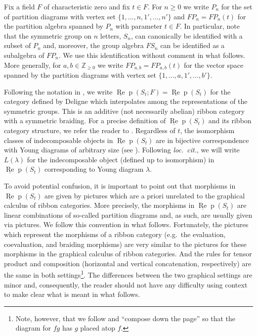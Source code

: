 \documentclass[12pt, reqno]{amsart}
\theoremstyle{definition}
\def\uRep{\underline{\operatorname{Re}}\!\operatorname{p}}
\renewcommand{\1}{_{(1)}}
\renewcommand{\2}{_{(2)}}
\newcommand{\3}{_{(3)}}
\newcommand{\4}{_{(4)}}
\newcommand{\Z}{\mathbb{Z}}
\begin{document}
Fix a field $F$ of characteristic zero and fix $t\in F$.   For $n \geq 0$ we write $P_{n}$ for the set of partition diagrams with vertex set $\{1,\dotsc , n,1', \dotsc , n' \}$ and $FP_{n}=FP_{n}(t)$ for the partition algebra spanned by $P_{n}$ with parameter $t \in F$.  In particular, note that the symmetric group on $n$ letters, $S_{n}$, can canonically be identified with a subset of $P_{n}$ and, moreover, the group algebra $FS_{n}$ can be identified as a subalgebra of $FP_{n}$.  We use this identification without comment in what follows.  More generally, for $a,b \in \Z_{\geq 0}$ we write $FP_{a,b}=FP_{a,b}(t)$ for the vector space spanned by the partition diagrams with vertex set $\{1, \dotsc , a, 1', \dotsc , b' \}$.


Following the notation in \cite{CO1}, we write $\uRep(S_t; F)=\uRep(S_t)$ for the category defined by Deligne which interpolates among the representations of the symmetric groups.  This is an additive (not necessarily abelian) ribbon category with a symmetric braiding.  For a precise definition of $\uRep (S_{t})$ and its ribbon category structure, we refer the reader to \cite[Section 2.2]{CO1}.  Regardless of $t$, the isomorphism classes of indecomposable objects in $\uRep(S_t)$ are in bijective correspondence with Young diagrams of arbitrary size (see \cite[Theorem 3.7]{CO1}).  Following \emph{loc.~cit.}, we will write $L(\lambda)$ for the indecomposable object (defined up to isomorphism) in $\uRep(S_t)$ corresponding to Young diagram $\lambda$. 


To avoid potential confusion, it is important to point out that morphisms in $\uRep (S_{t})$ are given by pictures which are a priori unrelated to the graphical calculus of ribbon categories.  More precisely, the morphisms in $\uRep (S_{t})$ are linear combinations of so-called partition diagrams and, as such, are usually given via pictures.  We follow this convention in what follows.  Fortunately, the pictures which represent the morphisms of a ribbon category (e.g.\ the evaluation, coevaluation, and braiding morphisms) are very similar to the pictures for these morphisms in the graphical calculus of ribbon categories. And the rules for tensor product and composition (horizontal and vertical concatenation, respectively) are the same in both settings\footnote{Note, however, that we follow \cite{CO1} and ``compose down the page'' so that the diagram for $fg$ has $g$ placed atop $f$.}. The differences between the two graphical settings are minor and, consequently, the reader should not have any difficulty using context to make clear what is meant in what follows.
\end{document}
